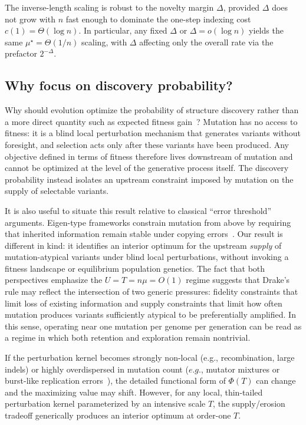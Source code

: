 \documentclass[9pt,twocolumn,oneside]{pnas-new}
\begin{document}
The inverse-length scaling is robust to the novelty margin $\Delta$, provided $\Delta$ does not grow with $n$ fast enough to dominate the one-step indexing cost $c(1)=\Theta(\log n)$. In particular, any fixed $\Delta$ or $\Delta=o(\log n)$ yields the same $\mu^\star=\Theta(1/n)$ scaling, with $\Delta$ affecting only the overall rate via the prefactor $2^{-\Delta}$.

\subsection*{Why focus on discovery probability?}
Why should evolution optimize the probability of structure discovery rather than a more direct quantity such as expected fitness gain~\cite{Lynch2010,SniegowskiRaynes2013,Hershberg2015}? Mutation has no access to fitness: it is a blind local perturbation mechanism that generates variants without foresight, and selection acts only after these variants have been produced. Any objective defined in terms of fitness therefore lives downstream of mutation and cannot be optimized at the level of the generative process itself. The discovery probability instead isolates an upstream constraint imposed by mutation on the supply of selectable variants.

It is also useful to situate this result relative to classical ``error threshold'' arguments. Eigen-type frameworks constrain mutation from above by requiring that inherited information remain stable under copying errors~\cite{Eigen1971}. Our result is different in kind: it identifies an interior optimum for the upstream \emph{supply} of mutation-atypical variants under blind local perturbations, without invoking a fitness landscape or equilibrium population genetics. The fact that both perspectives emphasize the $U=T=n\mu=O(1)$ regime suggests that Drake's rule may reflect the intersection of two generic pressures: fidelity constraints that limit loss of existing information and supply constraints that limit how often mutation produces variants sufficiently atypical to be preferentially amplified. In this sense, operating near one mutation per genome per generation can be read as a regime in which both retention and exploration remain nontrivial.

If the perturbation kernel becomes strongly non-local (e.g., recombination, large indels) or highly overdispersed in mutation count ($e.g.$, mutator mixtures or burst-like replication errors~\cite{SniegowskiRaynes2013,martin2024non}), the detailed functional form of $\Phi(T)$ can change and the maximizing value may shift. However, for any local, thin-tailed perturbation kernel parameterized by an intensive scale $T$, the supply/erosion tradeoff generically produces an interior optimum at order-one $T$.
\end{document}
